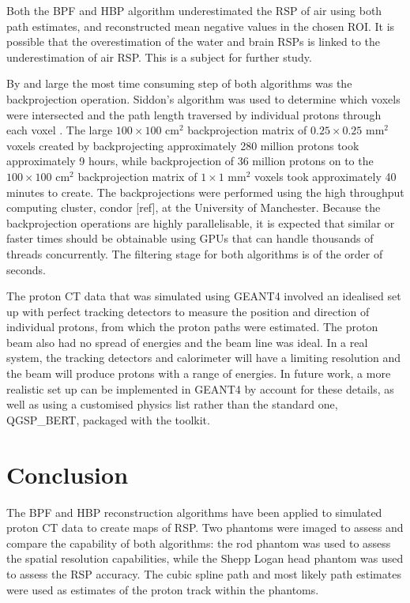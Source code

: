 \documentclass[11pt,a4paper]{article}
\begin{document}
Both the BPF and HBP algorithm underestimated the RSP of air using both path estimates, and reconstructed mean negative values in the chosen ROI. It is possible that the overestimation of the water and brain RSPs is linked to the underestimation of air RSP. This is a subject for further study.

By and large the most time consuming step of both algorithms was the backprojection operation. Siddon's algorithm was used to determine which voxels were intersected and the path length traversed by individual protons through each voxel \parencite{siddon1985fast}. The large $100 \times 100$ cm$^2$ backprojection matrix of $0.25 \times 0.25$ mm$^2$ voxels created by backprojecting approximately 280 million protons took approximately 9 hours, while backprojection of 36 million protons on to the $100 \times 100$ cm$^2$ backprojection matrix of $1 \times 1$ mm$^2$ voxels took approximately 40 minutes to create. The backprojections were performed using the high throughput computing cluster, condor [ref], at the University of Manchester. Because the backprojection operations are highly parallelisable, it is expected that similar or faster times should be obtainable using GPUs that can handle thousands of threads concurrently. The filtering stage for both algorithms is of the order of seconds.

The proton CT data that was simulated using GEANT4 involved an idealised set up with perfect tracking detectors to measure the position and direction of individual protons, from which the proton paths were estimated. The proton beam also had no spread of energies and the beam line was ideal. In a real system, the tracking detectors and calorimeter will have a limiting resolution and the beam will produce protons with a range of energies. In future work, a more realistic set up can be implemented in GEANT4 by account for these details, as well as using a customised physics list rather than the standard one, QGSP\_BERT, packaged with the toolkit. 

\section{Conclusion}
The BPF and HBP reconstruction algorithms have been applied to simulated proton CT data to create maps of RSP. Two phantoms were imaged to assess and compare the capability of both algorithms: the rod phantom was used to assess the spatial resolution capabilities, while the Shepp Logan head phantom was used to assess the RSP accuracy. The cubic spline path and most likely path estimates were used as estimates of the proton track within the phantoms.
\end{document}
